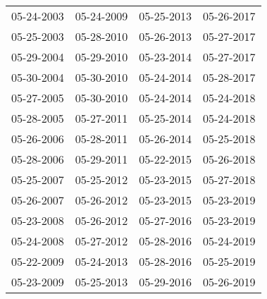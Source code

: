 \begin{supertabular}{llll}
 05-24-2003 &  05-24-2009 &  05-25-2013 &  05-26-2017 \\
 05-25-2003 &  05-28-2010 &  05-26-2013 &  05-27-2017 \\
 05-29-2004 &  05-29-2010 &  05-23-2014 &  05-27-2017 \\
 05-30-2004 &  05-30-2010 &  05-24-2014 &  05-28-2017 \\
 05-27-2005 &  05-30-2010 &  05-24-2014 &  05-24-2018 \\
 05-28-2005 &  05-27-2011 &  05-25-2014 &  05-24-2018 \\
 05-26-2006 &  05-28-2011 &  05-26-2014 &  05-25-2018 \\
 05-28-2006 &  05-29-2011 &  05-22-2015 &  05-26-2018 \\
 05-25-2007 &  05-25-2012 &  05-23-2015 &  05-27-2018 \\
 05-26-2007 &  05-26-2012 &  05-23-2015 &  05-23-2019 \\
 05-23-2008 &  05-26-2012 &  05-27-2016 &  05-23-2019 \\
 05-24-2008 &  05-27-2012 &  05-28-2016 &  05-24-2019 \\
 05-22-2009 &  05-24-2013 &  05-28-2016 &  05-25-2019 \\
 05-23-2009 &  05-25-2013 &  05-29-2016 &  05-26-2019 \\
\end{supertabular}
